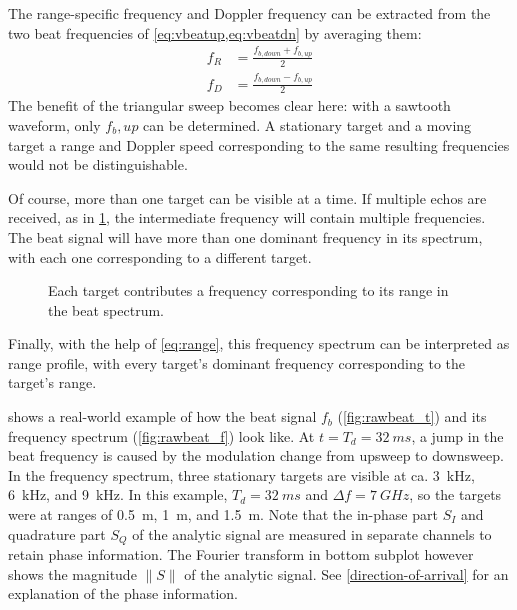The range-specific frequency and Doppler frequency can be extracted from the two beat frequencies of \cref{eq:vbeatup,eq:vbeatdn} by averaging them: 
\begin{align}
	f_R &= \frac{f_{b,down} + f_{b,up}}{2} \\
    f_D &= \frac{f_{b,down} - f_{b,up}}{2}
\end{align}
The benefit of the triangular sweep becomes clear here: with a sawtooth
waveform, only \(f_b,up\) can be determined. A stationary target and a
moving target a range and Doppler speed corresponding to the same
resulting frequencies would not be distinguishable.

Of course, more than one target can be visible at a time. If multiple
echos are received, as in \cref{fig:fmcw_multitarget}, the intermediate frequency will
contain multiple frequencies. The beat signal will have more than one
dominant frequency in its spectrum, with each one corresponding to a
different target.

\begin{figure}[htbp]
    \centering
    \def\svgwidth{10cm}
    
    \caption{Each target contributes a frequency corresponding to its range in the beat spectrum.}
    \label{fig:fmcw_multitarget}
\end{figure}

Finally, with the help of \cref{eq:range}, this frequency spectrum can be interpreted as range profile, with every target's dominant frequency corresponding to the target's range.

 shows a real-world example of how the beat signal \(f_b\)
(\cref{fig:rawbeat_t}) and its frequency spectrum (\cref{fig:rawbeat_f}) look like. At
\(t=T_d=\SI{32}{ms}\), a jump in the beat frequency is caused by the modulation
change from upsweep to downsweep. In the frequency spectrum, three
stationary targets are visible at ca. \SI{3}{kHz}, \SI{6}{kHz}, and \SI{9}{kHz}.
In this example, \(T_d=\SI{32}{ms}\) and \(\Delta f=\SI{7}{GHz}\), so the targets were
at ranges of \SI{0.5}{m}, \SI{1}{m}, and \SI{1.5}{m}. Note that the in-phase part
\(S_I\) and quadrature part \(S_Q\) of the analytic signal are measured
in separate channels to retain phase information. The Fourier transform
in bottom subplot however shows the magnitude \(\|S\|\) of the analytic
signal. See \cref{direction-of-arrival} for an explanation of the phase information.

